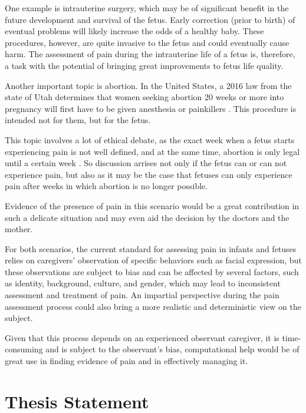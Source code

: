 One example is intrauterine surgery, which may be of significant benefit in the future development and survival of the fetus. Early correction (prior to birth) of eventual problems will likely increase the odds of a healthy baby. These procedures, however, are quite invasive to the fetus and could eventually cause harm. The assessment of pain during the intrauterine life of a fetus is, therefore, a task with the potential of bringing great improvements to fetus life quality. 

Another important topic is abortion. In the United States, a 2016 law from the state of Utah determines that women seeking abortion 20 weeks or more into pregnancy will first have to be given anesthesia or painkillers \citep{healy2016nytimes}. This procedure is intended not for them, but for the fetus. 

This topic involves a lot of ethical debate, as the exact week when a fetus starts experiencing pain is not well defined, and at the same time, abortion is only legal until a certain week \citep{Derbyshire2006}. So discussion arrises not only if the fetus can or can not experience pain, but also as it may be the case that fetuses can only experience pain after weeks in which abortion is no longer possible.


Evidence of the presence of pain in this scenario would be a great contribution in such a delicate situation and may even aid the decision by the doctors and the mother.

For both scenarios, the current standard for assessing pain in infants and fetuses relies on caregivers’ observation of specific behaviors such as facial expression, but these observations are subject to bias and can be affected by several factors, such as identity, background, culture, and gender, which may lead to inconsistent assessment and treatment of pain. An impartial perspective during the pain assessment process could also bring a more realistic and deterministic view on the subject.

Given that this process depends on an experienced observant caregiver, it is time-consuming and is subject to the observant's bias, computational help would be of great use in finding evidence of pain and in effectively managing it.

\section{Thesis Statement}

